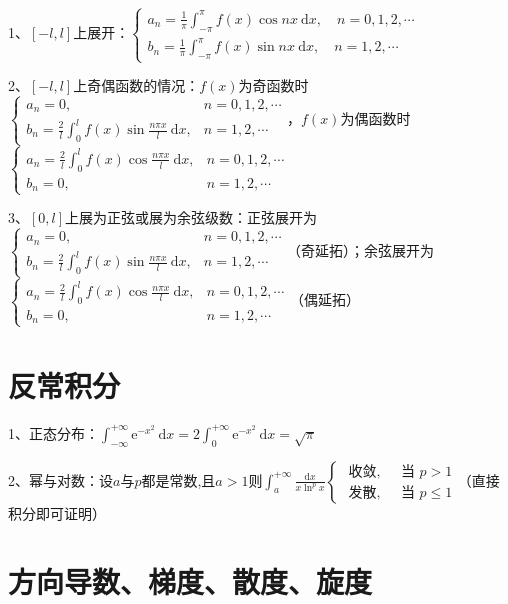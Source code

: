 1、$[-l, l]$上展开：$\left\{\begin{array}{l} a_{n}=\frac{1}{\pi} \int_{-\pi}^{\pi} f(x) \cos n x \mathrm{~d} x, \quad n=0,1,2, \cdots \\ b_{n}=\frac{1}{\pi} \int_{-\pi}^{\pi} f(x) \sin n x \mathrm{~d} x, \quad n=1,2, \cdots \end{array}\right.$

2、$[-l, l]$上奇偶函数的情况：$f(x)$为奇函数时$\begin{cases}a_{n}=0, & n=0,1,2, \cdots \\ b_{n}=\frac{2}{l} \int_{0}^{l} f(x) \sin \frac{n \pi x}{l} \mathrm{~d} x, & n=1,2, \cdots\end{cases}$，$f(x)$为偶函数时$\begin{cases}a_{n}=\frac{2}{l} \int_{0}^{l} f(x) \cos \frac{n \pi x}{l} \mathrm{~d} x, & n=0,1,2, \cdots \\ b_{n}=0, & n=1,2, \cdots\end{cases}$

3、$[0, l]$上展为正弦或展为余弦级数：正弦展开为$\begin{cases}a_{n}=0, & n=0,1,2, \cdots \\ b_{n}=\frac{2}{l} \int_{0}^{l} f(x) \sin \frac{n \pi x}{l} \mathrm{~d} x, & n=1,2, \cdots\end{cases}$（奇延拓）；余弦展开为$\begin{cases}a_{n}=\frac{2}{l} \int_{0}^{l} f(x) \cos \frac{n \pi x}{l} \mathrm{~d} x, & n=0,1,2, \cdots \\ b_{n}=0, & n=1,2, \cdots\end{cases}$（偶延拓）

\section{反常积分}

1、正态分布：$\int_{-\infty}^{+\infty} \mathrm{e}^{-x^{2}} \mathrm{~d} x=2 \int_{0}^{+\infty} \mathrm{e}^{-x^{2}} \mathrm{~d} x=\sqrt{\pi}$

2、幂与对数：设$a$与$p$都是常数,且$a>1$则$\int_{a}^{+\infty} \frac{\mathrm{d} x}{x \ln ^{p} x} \begin{cases}\text { 收敛, } & \text { 当 } p>1 \\ \text { 发散, } & \text { 当 } p \leqslant 1\end{cases}$（直接积分即可证明）

\section{方向导数、梯度、散度、旋度}



